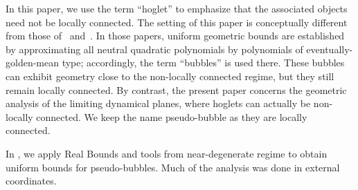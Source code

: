 \documentclass{amsart}
\begin{document}
\begin{remark}
\label{rem:name.hoglet} 
In this paper, we use the term ``hoglet'' to emphasize that the associated objects need not be locally connected. The setting of this paper is conceptually different from those of~\cite{DLy22} and~\cite{DLi26}. In those papers, uniform geometric bounds are established by approximating all neutral quadratic polynomials by polynomials of eventually-golden-mean type; accordingly, the term ``bubbles'' is used there. These bubbles can exhibit geometry close to the non-locally connected regime, but they still remain locally connected. By contrast, the present paper concerns the geometric analysis of the limiting dynamical planes, where hoglets can actually be non-locally connected. We keep the name pseudo-bubble as they are locally connected.
\end{remark}

In \cite{DLi26}, we apply Real Bounds and tools from near-degenerate regime to obtain uniform bounds for pseudo-bubbles.
Much of the analysis was done in external coordinates.
\end{document}
